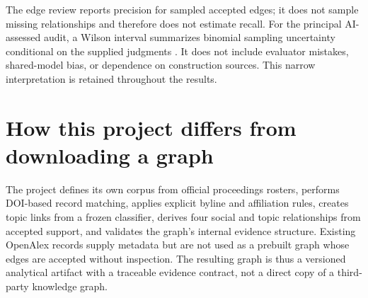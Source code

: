 The edge review reports precision for sampled accepted edges; it does not sample
missing relationships and therefore does not estimate recall. For the principal
AI-assessed audit, a Wilson interval summarizes binomial sampling uncertainty
conditional on the supplied judgments \citep{wilson1927inference}. It does not
include evaluator mistakes, shared-model bias, or dependence on construction
sources. This narrow interpretation is retained throughout the results.

\section{How this project differs from downloading a graph}

The project defines its own corpus from official proceedings rosters, performs
DOI-based record matching, applies explicit byline and affiliation rules, creates
topic links from a frozen classifier, derives four social and topic relationships
from accepted support, and validates the graph's internal evidence structure.
Existing OpenAlex records supply metadata but are not used as a prebuilt graph
whose edges are accepted without inspection. The resulting graph is thus a
versioned analytical artifact with a traceable evidence contract, not a direct
copy of a third-party knowledge graph.
